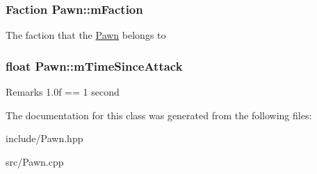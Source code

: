 \subsubsection[{m\+Faction}]{\setlength{\rightskip}{0pt plus 5cm}Faction Pawn\+::m\+Faction\hspace{0.3cm}{\ttfamily [protected]}}\label{class_pawn_ad37825a7c274b2418d2e9d9bdd8afbf1}
The faction that the \hyperlink{class_pawn}{Pawn} belongs to \hypertarget{class_pawn_a6ce596a12f726a288259e20fe8623bcb}{}
\subsubsection[{m\+Time\+Since\+Attack}]{\setlength{\rightskip}{0pt plus 5cm}float Pawn\+::m\+Time\+Since\+Attack\hspace{0.3cm}{\ttfamily [protected]}}\label{class_pawn_a6ce596a12f726a288259e20fe8623bcb}
\begin{DoxyRemark}{Remarks}
1.\+0f == 1 second 
\end{DoxyRemark}


The documentation for this class was generated from the following files\+:\begin{DoxyCompactItemize}
\item 
include/Pawn.\+hpp\item 
src/Pawn.\+cpp\end{DoxyCompactItemize}
